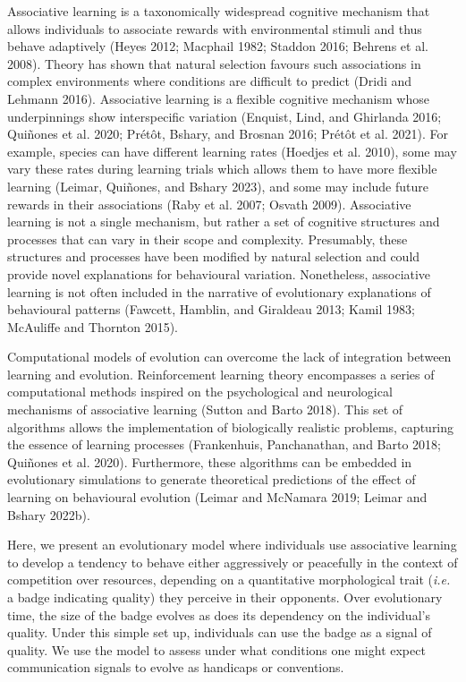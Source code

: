\documentclass[
  12pt,
]{article}
\begin{document}
Associative learning is a taxonomically widespread cognitive mechanism
that allows individuals to associate rewards with environmental stimuli
and thus behave adaptively (Heyes 2012; Macphail 1982; Staddon 2016;
Behrens et al. 2008). Theory has shown that natural selection favours
such associations in complex environments where conditions are difficult
to predict (Dridi and Lehmann 2016). Associative learning is a flexible
cognitive mechanism whose underpinnings show interspecific variation
(Enquist, Lind, and Ghirlanda 2016; Quiñones et al. 2020; Prétôt,
Bshary, and Brosnan 2016; Prétôt et al. 2021). For example, species can
have different learning rates (Hoedjes et al. 2010), some may vary these
rates during learning trials which allows them to have more flexible
learning (Leimar, Quiñones, and Bshary 2023), and some may include
future rewards in their associations (Raby et al. 2007; Osvath 2009).
Associative learning is not a single mechanism, but rather a set of
cognitive structures and processes that can vary in their scope and
complexity. Presumably, these structures and processes have been
modified by natural selection and could provide novel explanations for
behavioural variation. Nonetheless, associative learning is not often
included in the narrative of evolutionary explanations of behavioural
patterns (Fawcett, Hamblin, and Giraldeau 2013; Kamil 1983; McAuliffe
and Thornton 2015).

Computational models of evolution can overcome the lack of integration
between learning and evolution. Reinforcement learning theory
encompasses a series of computational methods inspired on the
psychological and neurological mechanisms of associative learning
(Sutton and Barto 2018). This set of algorithms allows the
implementation of biologically realistic problems, capturing the essence
of learning processes (Frankenhuis, Panchanathan, and Barto 2018;
Quiñones et al. 2020). Furthermore, these algorithms can be embedded in
evolutionary simulations to generate theoretical predictions of the
effect of learning on behavioural evolution (Leimar and McNamara 2019;
Leimar and Bshary 2022b).

Here, we present an evolutionary model where individuals use associative
learning to develop a tendency to behave either aggressively or
peacefully in the context of competition over resources, depending on a
quantitative morphological trait (\emph{i.e.} a badge indicating
quality) they perceive in their opponents. Over evolutionary time, the
size of the badge evolves as does its dependency on the individual's
quality. Under this simple set up, individuals can use the badge as a
signal of quality. We use the model to assess under what conditions one
might expect communication signals to evolve as handicaps or
conventions.
\end{document}
